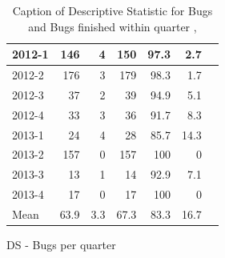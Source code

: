 \documentclass[UKenglish]{ifimaster}  %
\begin{document}
\begin{appendices}
\begin{table}[!htbp]
\begin{adjustwidth}{-1.5cm}{}
\begin{subfigure}[b]{0.3\textwidth}
{\begin{tabular}{ | l | r | r | r | r | r | r | }
2012-1 & 146 & 4 & 150 & 97.3 & 2.7 \\ \hline
2012-2 & 176 & 3 & 179 & 98.3& 1.7 \\ \hline
2012-3 & 37 & 2 & 39 & 94.9& 5.1\\ \hline
2012-4 & 33 & 3 & 36 & 91.7 & 8.3 \\ \hline
2013-1 & 24 & 4 & 28 & 85.7 & 14.3 \\ \hline
2013-2 & 157 & 0 & 157 & 100 & 0 \\ \hline
2013-3 & 13 & 1 & 14 & 92.9& 7.1 \\ \hline
2013-4 & 17 & 0 & 17 & 100 & 0 \\ \hline
Mean & 63.9&3.3&67.3&83.3&16.7\\ \hline
\end{tabular}
}
\caption{DS - Bugs per quarter}
\label{DS:FTPQ:1}
\end{subfigure}
\end{adjustwidth}
\caption[Optional caption for list of figures]{Caption of Descriptive Statistic for Bugs and Bugs finished within quarter  , }
\label{DS:1:5} %
\end{table}
 


 

\end{appendices}
\end{document}
